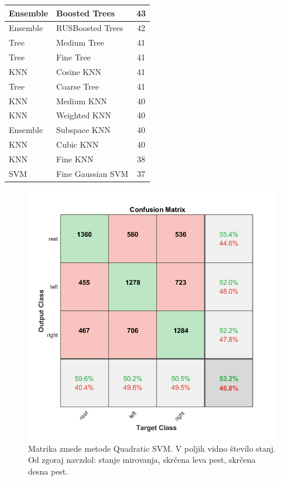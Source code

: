 \begin{table}
\begin{tabular}{|l|l|c|}
\hline Ensemble&Boosted Trees&43\\
\hline Ensemble&RUSBoosted Trees&42\\
\hline Tree&Medium Tree&41\\
\hline Tree&Fine Tree&41\\
\hline KNN&Cosine KNN&41\\
\hline Tree&Coarse Tree&41\\
\hline KNN&Medium KNN&40\\
\hline KNN&Weighted KNN&40\\
\hline Ensemble&Subspace KNN&40\\
\hline KNN&Cubic KNN&40\\
\hline KNN&Fine KNN&38\\
\hline SVM&Fine Gaussian SVM&37\\

\hline
\end{tabular}

\label{tabela:primerjava_tocnosti}
\end{table}

\begin{figure}
    \begin{center}
    \includegraphics[width=0.8\linewidth]{slike/ConfusionSVM.png}
    \end{center}
    \caption[Matrika zmede metode Quadratic SVM.]{Matrika zmede metode Quadratic SVM. V poljih vidno število stanj. Od zgoraj navzdol: stanje mirovanja, skrčena leva pest, skrčena desna pest.}
    \label{slika:SVM_matrika}
    \end{figure}

